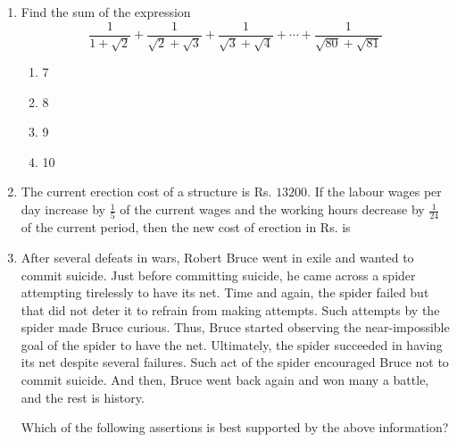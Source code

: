 \documentclass[journal]{IEEEtran}
\begin{document}
\begin{enumerate}[leftmargin=0pt]
\item
Find the sum of the expression $$\frac{1}{1 + \sqrt{2}} 
+ \frac{1}{\sqrt{2} + \sqrt{3}} 
+ \frac{1}{\sqrt{3} + \sqrt{4}} 
+ \cdots 
+ \frac{1}{\sqrt{80} + \sqrt{81}}$$

\begin{enumerate}
\item 7
\item 8
\item 9
\item 10
\end{enumerate}




\item The current erection cost of a structure is Rs. $13200$. If the labour wages per day increase by $\frac15$ of the current wages and the working hours decrease by $\frac{1}{24}$ of the current period, then the new cost of erection in Rs. is
\begin{enumerate}
\end{enumerate}
\hfill{}

\item After several defeats in wars, Robert Bruce went in exile and wanted to commit suicide. Just before committing suicide, he came across a spider attempting tirelessly to have its net. Time and again, the spider failed but that did not deter it to refrain from making attempts. Such attempts by the spider made Bruce curious. Thus, Bruce started observing the near-impossible goal of the spider to have the net. Ultimately, the spider succeeded in having its net despite several failures. Such act of the spider encouraged Bruce not to commit suicide. And then, Bruce went back again and won many a battle, and the rest is history.  

Which of the following assertions is best supported by the above information?
\begin{enumerate}
\end{enumerate}
\hfill{}
\end{enumerate}
\end{document}
